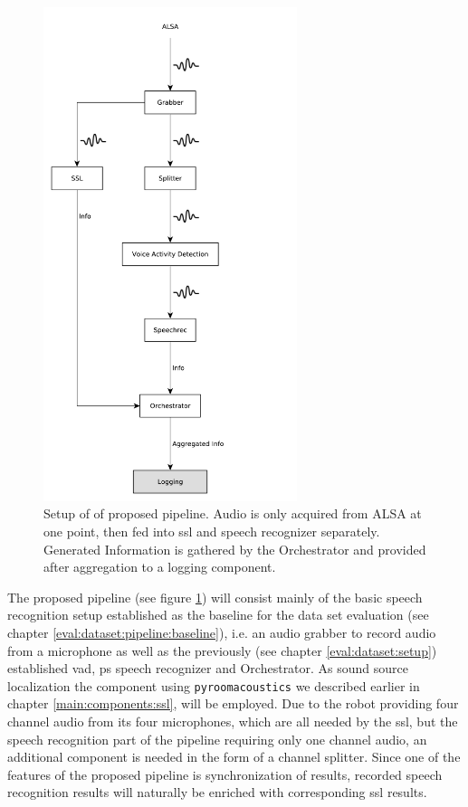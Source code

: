 \begin{figure}[]
	\centering
	\includegraphics[width=0.66\textwidth]{diagrams/eval_task_proposed.pdf}
	\caption{Setup of of proposed pipeline.
		Audio is only acquired from ALSA at one point, then fed into \gls{ssl} and speech recognizer separately.
		Generated Information is gathered by the Orchestrator and provided after aggregation to a logging component.}
	\label{pic:eval_task_setup_new}
\end{figure}

The proposed pipeline (see figure \ref{pic:eval_task_setup_new}) will consist mainly of the basic speech recognition setup established as the baseline for the data set evaluation (see chapter \ref{eval:dataset:pipeline:baseline}), i.e. an audio grabber to record audio from a microphone as well as the previously (see chapter \ref{eval:dataset:setup}) established \gls{vad}, \gls{ps} speech recognizer and Orchestrator.
As sound source localization the component using \texttt{pyroomacoustics} we described earlier in chapter \ref{main:components:ssl}, will be employed.
Due to the robot providing four channel audio from its four microphones, which are all needed by the \gls{ssl}, but the speech recognition part of the pipeline requiring only one channel audio, an additional component is needed in the form of a channel splitter.
Since one of the features of the proposed pipeline is synchronization of results, recorded speech recognition results will naturally be enriched with corresponding \gls{ssl} results.

